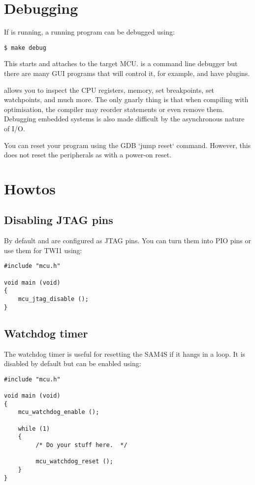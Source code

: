 \section{Debugging}
\label{debugging}

If  is running, a running program can be debugged using:

\begin{verbatim}
$ make debug
\end{verbatim}

This starts  and attaches to the target MCU.  is a
command line debugger but there are many GUI programs that will control
it, for example,  and  have plugins.

 allows you to inspect the CPU registers, memory, set
breakpoints, set watchpoints, and much more. The only gnarly thing is
that when compiling with optimisation, the compiler may reorder
statements or even remove them. Debugging embedded systems is also made
difficult by the asynchronous nature of I/O.

You can reset your program using the GDB `jump reset` command. However,
this does not reset the peripherals as with a power-on reset.

\section{Howtos}
\label{howtos}

\subsection{Disabling JTAG pins}
\label{disabling-jtag-pins}

By default  and  are configured as JTAG pins. You can turn
them into PIO pins or use them for TWI1 using:
%
\begin{verbatim}
#include "mcu.h"

void main (void)
{
    mcu_jtag_disable ();
}
\end{verbatim}

\subsection{Watchdog timer}
\label{watchdog-timer}

The watchdog timer is useful for resetting the SAM4S if it hangs in a
loop.  It is disabled by default but can be enabled using:
%
\begin{verbatim}
#include "mcu.h"

void main (void)
{
    mcu_watchdog_enable ();
   
    while (1)
    {
         /* Do your stuff here.  */

         mcu_watchdog_reset ();
    }
}
\end{verbatim}

